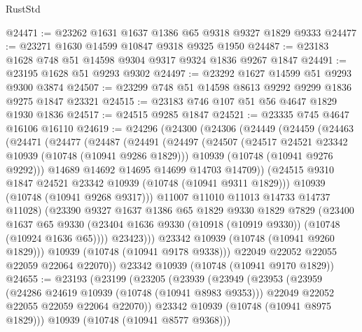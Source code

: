 \begin{lexlean}{RustStd}
\begin{coremodule}
@24471 := @23262 @1631 @1637 @1386 @65 @9318 @9327 @1829 @9333
@24477 := @23271 @1630 @14599 @10847 @9318 @9325 @1950
@24487 := @23183 @1628 @748 @51 @14598 @9304 @9317 @9324 @1836 @9267 @1847
@24491 := @23195 @1628 @51 @9293 @9302
@24497 := @23292 @1627 @14599 @51 @9293 @9300 @3874
@24507 := @23299 @748 @51 @14598 @8613 @9292 @9299 @1836 @9275 @1847 @23321
@24515 := @23183 @746 @107 @51 @56 @4647 @1829 @1930 @1836
@24517 := @24515 @9285 @1847
@24521 := @23335 @745 @4647 @16106 @16110
@24619 := @24296
    (@24300
      (@24306
        (@24449
          (@24459
            (@24463
              (@24471
                (@24477
                  (@24487
                    (@24491
                      (@24497
                        (@24507
                          (@24517 @24521 @23342 @10939 (@10748 (@10941 @9286 @1829)))
                          @10939
                          (@10748 (@10941 @9276 @9292)))
                        @14689
                        @14692
                        @14695
                        @14699
                        @14703
                        @14709))
                    (@24515 @9310 @1847 @24521 @23342 @10939 (@10748 (@10941 @9311 @1829)))
                    @10939
                    (@10748 (@10941 @9268 @9317)))
                  @11007
                  @11010
                  @11013
                  @14733
                  @14737
                  @11028)
                (@23390
                  @9327
                  @1637
                  @1386
                  @65
                  @1829
                  @9330
                  @1829
                  @7829
                  (@23400
                    @1637
                    @65
                    @9330
                    (@23404 @1636 @9330 (@10918 (@10919 @9330)) (@10748 (@10924 @1636 @65))))
                  @23423)))
            @23342
            @10939
            (@10748 (@10941 @9260 @1829)))
          @10939
          (@10748 (@10941 @9178 @9338)))
        @22049
        @22052
        @22055
        @22059
        @22064
        @22070))
    @23342
    @10939
    (@10748 (@10941 @9170 @1829))
@24655 := @23193
    (@23199
      (@23205
        (@23939
          (@23949
            (@23953
              (@23959
                (@24286 @24619 @10939 (@10748 (@10941 @8983 @9353)))
                @22049
                @22052
                @22055
                @22059
                @22064
                @22070))
            @23342
            @10939
            (@10748 (@10941 @8975 @1829)))
          @10939
          (@10748 (@10941 @8577 @9368)))

\end{coremodule}
\end{lexlean}
